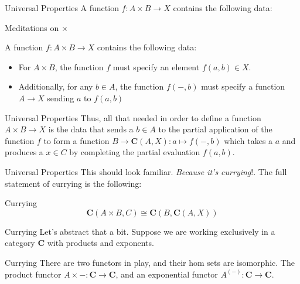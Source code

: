 \documentclass[tikz]{beamer}
\theoremstyle{definition}
\newcommand{\cat}[1]{\mathbf{#1}}
\begin{document}
\begin{frame}{Universal Properties}
    A function $f: A \times B \to X$ contains the following data:
\end{frame}{}

\begin{frame}{Meditations on $\times$}

    A function $f: A \times B \to X$ contains the following data:
    \begin{block}{}

        \begin{itemize}
            \item For $A \times B$, the function $f$ must specify an element $f(a,b) \in X$.

            \item Additionally, for any $b \in A$, the function $f(-,b)$ must specify a function $A \to X$ sending $a$ to $f(a,b)$
        \end{itemize}
    \end{block}{}
\end{frame}{}

\begin{frame}{Universal Properties}
    Thus, all that needed in order to define a function $A \times B \to X$ is the data that sends a $b \in A$ to the partial application of the function $f$ to form a function $B \to \mathbf{C}(A, X): a \mapsto f(-,b)$ which takes a $a$ and produces a $x \in C$ by completing the partial evaluation $f(a,b)$.
\end{frame}{}

\begin{frame}{Universal Properties}
    This should look familiar. \textit{Because it's currying}!. The full statement of currying is the following:

\begin{block}{Currying}
\begin{equation*}
    \mathbf{C}(A \times B, C) \cong \mathbf{C}(B, \mathbf{C}(A, X))
\end{equation*}{}
\end{block}{}
\end{frame}

\begin{frame}{Currying}
    Let's abstract that a bit. Suppose we are working exclusively in a category $\cat{C}$ with products and exponents.
\end{frame}

\begin{frame}{Currying}
   There are two functors in play, and their hom sets are isomorphic. The product functor $A \times - : \cat{C} \to \cat{C}$, and an exponential functor $A^{(-)}: \cat{C} \to \cat{C}$.
\end{frame}
\end{document}
